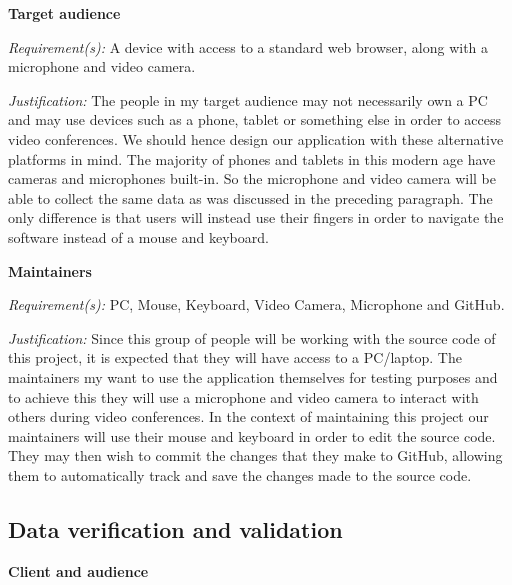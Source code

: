 \textsf{\bfseries Target audience} \\ \vspace{0.1cm}

\textit{Requirement(s):} A device with access to a standard web browser,
along with a microphone and video camera.
\\ \vspace{0.1cm}

\textit{Justification:}
The people in my target audience may not necessarily
own a PC and may use devices such as a phone, tablet
or something else in order to access video conferences.
We should hence design our application with these
alternative platforms in mind. The majority of phones
and tablets in this modern age have cameras and
microphones built-in. So the microphone and video camera
will be able to collect the same data as was discussed
in the preceding paragraph. The only difference is that
users will instead use their fingers in order to navigate
the software instead of a mouse and keyboard.
\\ \vspace{0.2cm}

\textsf{\bfseries Maintainers} \\ \vspace{0.1cm}

\textit{Requirement(s):} PC, Mouse, Keyboard, Video Camera, Microphone and GitHub.
\\ \vspace{0.1cm}

\textit{Justification:}
Since this group of people will be working with the source
code of this project, it is expected that they will have
access to a PC/laptop. The maintainers my want to use the
application themselves for testing purposes and to achieve
this they will use a microphone and video camera to interact
with others during video conferences. In the context of
maintaining this project our maintainers will use their
mouse and keyboard in order to edit the source code. They
may then wish to commit the changes that they make to
GitHub, allowing them to automatically track and save the
changes made to the source code.

\subsection{Data verification and validation}

\textsf{\bfseries Client and audience} \\ \vspace{0.1cm}

